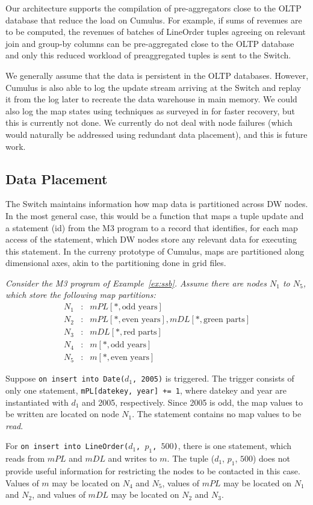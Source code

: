 Our architecture supports the compilation of pre-aggrega\-tors close to the
OLTP database that reduce the load on Cumulus. For example, if sums of revenues
are to be computed, the revenues of batches of LineOrder tuples agreeing
on relevant join and group-by columns can be pre-aggregated close to the OLTP database and only this reduced workload of preaggregated tuples is sent to the Switch.

We generally assume that the data is persistent in the OLTP databases.
However, Cumulus is also able to
log the update stream arriving at the Switch and replay it from the
log later to recreate the data warehouse in main memory.
We could also log the map states using techniques as surveyed in
\cite{DBLP:journals/pvldb/SallesCSDGKW09}
for faster recovery, but this is currently not done.
We currently do not deal with node failures (which would naturally
be addressed using redundant data placement), and this is future work.


\subsection{Data Placement}


The Switch maintains information how map data is partitioned across
DW nodes. In the most general case, this would be a function
that maps a tuple update and a statement (id) from the M3 program to
a record that identifies, for each map access of the statement,
which DW nodes store any relevant data for executing this
statement.
%
In the curreny prototype of Cumulus, maps are partitioned along
dimensional axes, akin to the partitioning done in grid files\cite{318586}.


\begin{example}\em
\label{ex:switch_msg}
Consider the M3 program of Example~\ref{ex:ssb}.
Assume there are nodes $N_1$ to $N_5$,
which store the following map partitions:
\begin{eqnarray*}
N_1 &:& mPL[*, \mbox{odd years}] \\
N_2 &:& mPL[*, \mbox{even years}], mDL[*, \mbox{green parts}] \\ 
N_3 &:& mDL[*, \mbox{red parts}] \\ 
N_4 &:& m[*, \mbox{odd years}] \\
N_5 &:& m[*, \mbox{even years}]
\end{eqnarray*}

Suppose {\tt on insert into Date($d_1$, 2005)} is triggered.
The trigger consists of only one statement,
{\tt mPL[datekey, year] += 1}, where datekey and year are instantiated
with $d_1$ and 2005, respectively. Since 2005 is odd,
the map values to be written are located on node $N_1$.
The statement contains no map values to be {\em read}.

For {\tt on insert into LineOrder($d_1$, $p_1$, $500$)},
there is one statement, which reads from $mPL$ and $mDL$ and writes to $m$.
The tuple ($d_1$, $p_1$, $500$)
does not provide useful information for restricting the nodes to be contacted
in this case.
Values of $m$ may be located on $N_4$ and $N_5$, values of $mPL$ may be
located on $N_1$ and $N_2$, and values of $mDL$ may be located on $N_2$ and
$N_3$.
\punto
\end{example}


